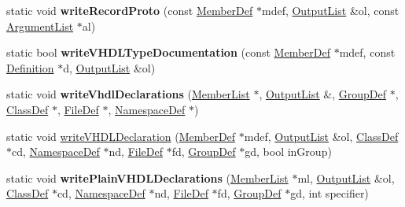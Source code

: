 \begin{DoxyCompactItemize}
\mbox{\label{class_vhdl_doc_gen_a4be0e9c1867f4bdc5a06f1ca54905d4b}} 
static void {\bfseries write\+Record\+Proto} (const \mbox{\hyperlink{class_member_def}{Member\+Def}} $\ast$mdef, \mbox{\hyperlink{class_output_list}{Output\+List}} \&ol, const \mbox{\hyperlink{class_argument_list}{Argument\+List}} $\ast$al)
\item 
\mbox{\label{class_vhdl_doc_gen_a0218e5158efa51df8490073c645c9a79}} 
static bool {\bfseries write\+V\+H\+D\+L\+Type\+Documentation} (const \mbox{\hyperlink{class_member_def}{Member\+Def}} $\ast$mdef, const \mbox{\hyperlink{class_definition}{Definition}} $\ast$d, \mbox{\hyperlink{class_output_list}{Output\+List}} \&ol)
\item 
\mbox{\label{class_vhdl_doc_gen_a26d6d3e1a28067a7a5c9f8624f642654}} 
static void {\bfseries write\+Vhdl\+Declarations} (\mbox{\hyperlink{class_member_list}{Member\+List}} $\ast$, \mbox{\hyperlink{class_output_list}{Output\+List}} \&, \mbox{\hyperlink{class_group_def}{Group\+Def}} $\ast$, \mbox{\hyperlink{class_class_def}{Class\+Def}} $\ast$, \mbox{\hyperlink{class_file_def}{File\+Def}} $\ast$, \mbox{\hyperlink{class_namespace_def}{Namespace\+Def}} $\ast$)
\item 
static void \mbox{\hyperlink{class_vhdl_doc_gen_ac5c7235e2572f9dab6475d5af835e437}{write\+V\+H\+D\+L\+Declaration}} (\mbox{\hyperlink{class_member_def}{Member\+Def}} $\ast$mdef, \mbox{\hyperlink{class_output_list}{Output\+List}} \&ol, \mbox{\hyperlink{class_class_def}{Class\+Def}} $\ast$cd, \mbox{\hyperlink{class_namespace_def}{Namespace\+Def}} $\ast$nd, \mbox{\hyperlink{class_file_def}{File\+Def}} $\ast$fd, \mbox{\hyperlink{class_group_def}{Group\+Def}} $\ast$gd, bool in\+Group)
\item 
\mbox{\label{class_vhdl_doc_gen_ae7a0bfaf11295ea18c656b14fb54203a}} 
static void {\bfseries write\+Plain\+V\+H\+D\+L\+Declarations} (\mbox{\hyperlink{class_member_list}{Member\+List}} $\ast$ml, \mbox{\hyperlink{class_output_list}{Output\+List}} \&ol, \mbox{\hyperlink{class_class_def}{Class\+Def}} $\ast$cd, \mbox{\hyperlink{class_namespace_def}{Namespace\+Def}} $\ast$nd, \mbox{\hyperlink{class_file_def}{File\+Def}} $\ast$fd, \mbox{\hyperlink{class_group_def}{Group\+Def}} $\ast$gd, int specifier)
\item 
\mbox{\label{class_vhdl_doc_gen_a30ec463210e92bb4f1cdd02bf1893c86}} 

\end{DoxyCompactItemize}
